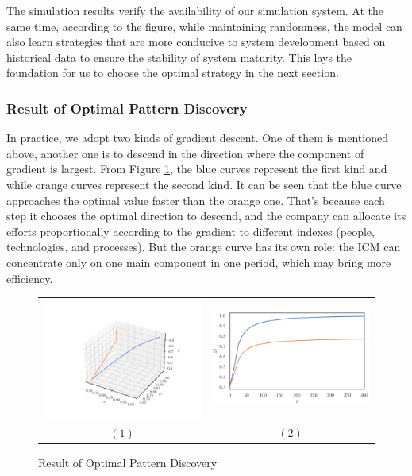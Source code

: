 \documentclass{mcmthesis}
\begin{document}
The simulation results verify the availability of our simulation system. At the same time, according to the figure, while maintaining randomness, the model can also learn strategies that are more conducive to system development based on historical data to ensure the stability of system maturity. This lays the foundation for us to choose the optimal strategy in the next section.

\subsubsection{Result of Optimal Pattern Discovery}
In practice, we adopt two kinds of gradient descent. One of them is mentioned above, another one is to descend in the direction where the component of gradient is largest. From Figure \ref{figure::y3y4}, the blue curves represent the first kind and while orange curves represent the second kind. It can be seen that the blue curve approaches the optimal value faster than the orange one. That's because each step it chooses the optimal direction to descend, and the company can allocate its efforts proportionally according to the gradient to different indexes (people, technologies, and processes). But the orange curve has its own role: the ICM can concentrate only on one main component in one period, which may bring more efficiency.

\begin{figure}[!htbp]
    \small
    \centering
    \begin{tabular}{cc}
        \includegraphics[width=7cm]{figures/21.2.png} &
        \includegraphics[width=7cm]{figures/y3y4.png} \\
        $(1)$ & $(2)$ \\
    \end{tabular}
    \caption{Result of Optimal Pattern Discovery}
    \label{figure::y3y4}
\end{figure}
\end{document}
